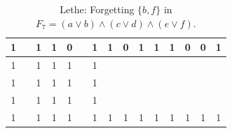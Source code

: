 \begin{table}[!tb]
\begin{tabular}{|c|c|c|c|c|c|c|c|c|c|c|c|c|c|c|}
        \rowcolor{yellow!40} 1 &  & 1 & 1 & 0 &  & 1 & 1 & 0 & 1 & 1 & 1 & 0 & 0 & 1 \\ \hline
        \rowcolor{gray!40} 1 &  & 1 & 1 & 1 &  & 1 &  &  &  &  &  &  &  &  \\ \hline
        \rowcolor{gray!40} 1 &  & 1 & 1 & 1 &  & 1 &  &  &  &  &  &  &  &  \\ \hline
        \rowcolor{gray!40} 1 &  & 1 & 1 & 1 &  & 1 &  &  &  &  &  &  &  &  \\ \hline
        \rowcolor{gray!40} 1 &  & 1 & 1 & 1 &  & 1 & 1 & 1 & 1 & 1 & 1 & 1 & 1 & 1 \\ \hline
    \end{tabular}
    \caption{Lethe: Forgetting $\{b, f\}$ in $F_{7} = (a \lor b) \land (c \lor d) \land (e \lor f)$.}
    \label{tab:lethe-F7-bf}
\end{table}
